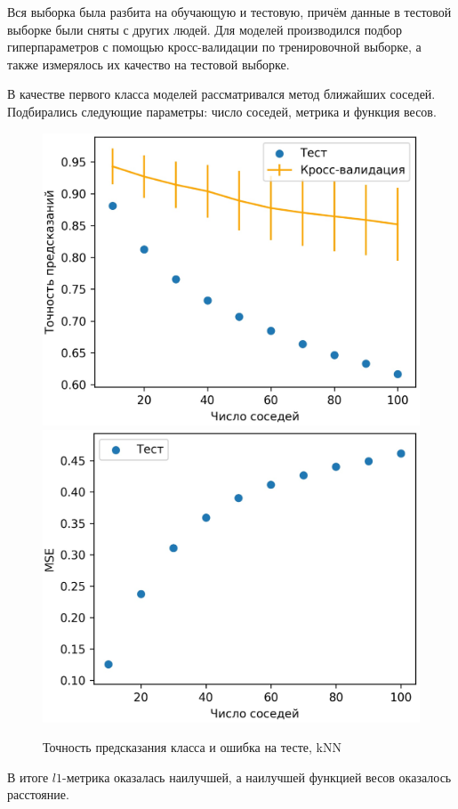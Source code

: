 \documentclass[12pt,twoside]{article}
\begin{document}
Вся выборка была разбита на обучающую и тестовую, причём данные в тестовой выборке были сняты с других людей.
Для моделей производился подбор гиперпараметров с помощью кросс-валидации по тренировочной выборке, а также измерялось их качество на тестовой выборке.

В качестве первого класса моделей рассматривался метод ближайших соседей. Подбирались следующие параметры: число соседей, метрика и функция весов.

\begin{figure}[H]
    \includegraphics[scale=0.15]{charts/knn.eps}
    \includegraphics[scale=0.15]{charts/knn_mse.eps}
    \centering
    \caption{Точность предсказания класса и ошибка на тесте, kNN}
\end{figure}

В итоге $l1$-метрика оказалась наилучшей, а наилучшей функцией весов оказалось расстояние.



\end{document}
